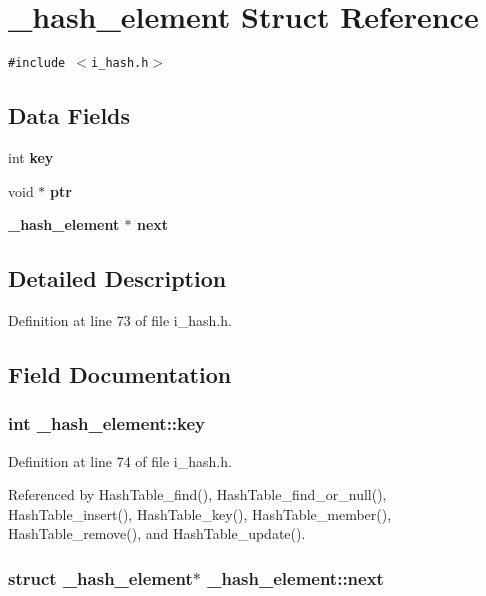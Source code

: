\section{\_\-hash\_\-element Struct Reference}
\label{struct__hash__element}
{\tt \#include $<$i\_\-hash.h$>$}

\subsection*{Data Fields}
\begin{CompactItemize}
\item 
int \bf{key}
\item 
void $\ast$ \bf{ptr}
\item 
\bf{\_\-hash\_\-element} $\ast$ \bf{next}
\end{CompactItemize}


\subsection{Detailed Description}




Definition at line 73 of file i\_\-hash.h.

\subsection{Field Documentation}
\subsubsection{\setlength{\rightskip}{0pt plus 5cm}int \bf{\_\-hash\_\-element::key}}\label{struct__hash__element_a587a264d1bd2bb2e6c242970e67a92a}




Definition at line 74 of file i\_\-hash.h.

Referenced by Hash\-Table\_\-find(), Hash\-Table\_\-find\_\-or\_\-null(), Hash\-Table\_\-insert(), Hash\-Table\_\-key(), Hash\-Table\_\-member(), Hash\-Table\_\-remove(), and Hash\-Table\_\-update().
\subsubsection{\setlength{\rightskip}{0pt plus 5cm}struct \bf{\_\-hash\_\-element}$\ast$ \bf{\_\-hash\_\-element::next}}\label{struct__hash__element_7f8f1ce9d330d6ea9d9b88100b6049e5}




